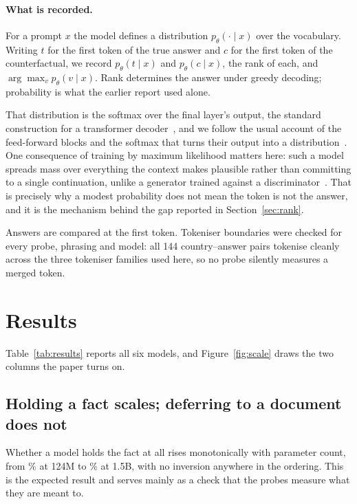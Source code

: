 \documentclass{article}
\begin{document}
\paragraph{What is recorded.} For a prompt $x$ the model defines a distribution
$p_\theta(\cdot \mid x)$ over the vocabulary. Writing $t$ for the first token of
the true answer and $c$ for the first token of the counterfactual, we record
$p_\theta(t \mid x)$ and $p_\theta(c \mid x)$, the rank of each, and
$\arg\max_v p_\theta(v \mid x)$. Rank determines the answer under greedy
decoding; probability is what the earlier report used alone.

That distribution is the softmax over the final layer's output, the standard
construction for a transformer decoder~\citep{vaswani2017attention}, and we
follow the usual account of the feed-forward blocks and the softmax that turns
their output into a distribution~\citep{thakur2021fundamentals}. One consequence
of training by maximum likelihood matters here: such a model spreads mass over
everything the context makes plausible rather than committing to a single
continuation, unlike a generator trained against a
discriminator~\citep{thakur2021gan}. That is precisely why a modest probability
does not mean the token is not the answer, and it is the mechanism behind the
gap reported in Section~\ref{sec:rank}.

Answers are compared at the first token. Tokeniser boundaries were checked for
every probe, phrasing and model: all 144 country--answer pairs tokenise cleanly
across the three tokeniser families used here, so no probe silently measures a
merged token.

\section{Results}

Table~\ref{tab:results} reports all six models, and Figure~\ref{fig:scale} draws
the two columns the paper turns on.





\subsection{Holding a fact scales; deferring to a document does not}

Whether a model holds the fact at all rises monotonically with parameter count,
from \KnowsMin\% at 124M to \KnowsMax\% at 1.5B, with no inversion anywhere in
the ordering. This is the expected result and serves mainly as a check that the
probes measure what they are meant to.
\end{document}
